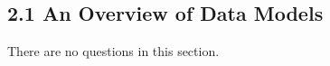 \documentclass[../../main.tex]{subfiles}
\begin{document}
\subsection{2.1 An Overview of Data Models}

There are no questions in this section.
\end{document}
